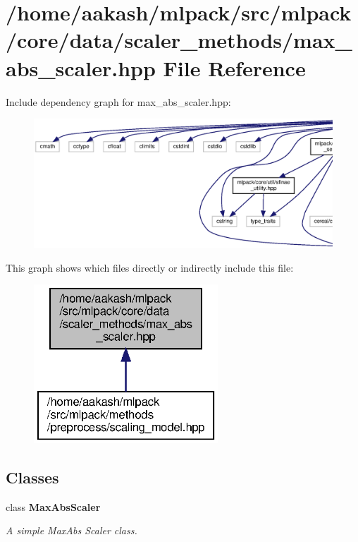 \section{/home/aakash/mlpack/src/mlpack/core/data/scaler\+\_\+methods/max\+\_\+abs\+\_\+scaler.hpp File Reference}
\label{max__abs__scaler_8hpp}
Include dependency graph for max\+\_\+abs\+\_\+scaler.\+hpp\+:
\nopagebreak
\begin{figure}[H]
\begin{center}
\leavevmode
\includegraphics[width=350pt]{max__abs__scaler_8hpp__incl}
\end{center}
\end{figure}
This graph shows which files directly or indirectly include this file\+:
\nopagebreak
\begin{figure}[H]
\begin{center}
\leavevmode
\includegraphics[width=196pt]{max__abs__scaler_8hpp__dep__incl}
\end{center}
\end{figure}
\subsection*{Classes}
\begin{DoxyCompactItemize}
\item 
class \textbf{ Max\+Abs\+Scaler}
\begin{DoxyCompactList}\small\item\em A simple Max\+Abs Scaler class. \end{DoxyCompactList}\end{DoxyCompactItemize}
